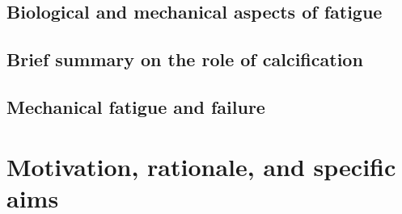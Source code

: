 \subsection{Biological and mechanical aspects of fatigue}

\subsection{Brief summary on the role of calcification}

\subsection{Mechanical fatigue and failure}

\section{Motivation, rationale, and specific aims}








